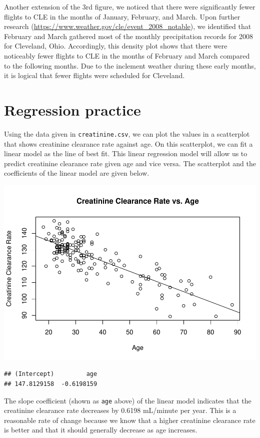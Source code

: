 \documentclass[]{article}
\begin{document}
Another extension of the 3rd figure, we noticed that there were
significantly fewer flights to CLE in the months of January, February,
and March. Upon further research
(\url{https://www.weather.gov/cle/event_2008_notable}), we identified
that February and March gathered most of the monthly precipitation
records for 2008 for Cleveland, Ohio. Accordingly, this density plot
shows that there were noticeably fewer flights to CLE in the months of
February and March compared to the following months. Due to the
inclement weather during these early months, it is logical that fewer
flights were scheduled for Cleveland.

\hypertarget{regression-practice}{%
\section{Regression practice}\label{regression-practice}}

Using the data given in \texttt{creatinine.csv}, we can plot the values
in a scatterplot that shows creatinine clearance rate against age. On
this scatterplot, we can fit a linear model as the line of best fit.
This linear regression model will allow us to predict creatinine
clearance rate given age and vice versa. The scatterplot and the
coefficients of the linear model are given below.

\includegraphics{Report_files/figure-latex/creatinine2-1.pdf}

\begin{verbatim}
## (Intercept)         age 
## 147.8129158  -0.6198159
\end{verbatim}

The slope coefficient (shown as \texttt{age} above) of the linear model
indicates that the creatinine clearance rate decreases by 0.6198
mL/minute per year. This is a reasonable rate of change because we know
that a higher creatinine clearance rate is better and that it should
generally decrease as age increases.
\end{document}
